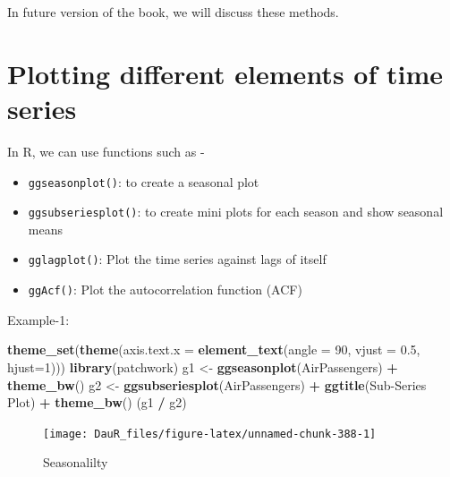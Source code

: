 \documentclass[
]{book}
\newenvironment{Shaded}{\begin{snugshade}}{\end{snugshade}}
\newcommand{\AttributeTok}[1]{\textcolor[rgb]{0.13,0.29,0.53}{#1}}
\newcommand{\DecValTok}[1]{\textcolor[rgb]{0.00,0.00,0.81}{#1}}
\newcommand{\FloatTok}[1]{\textcolor[rgb]{0.00,0.00,0.81}{#1}}
\newcommand{\FunctionTok}[1]{\textcolor[rgb]{0.13,0.29,0.53}{\textbf{#1}}}
\newcommand{\NormalTok}[1]{#1}
\newcommand{\OtherTok}[1]{\textcolor[rgb]{0.56,0.35,0.01}{#1}}
\newcommand{\SpecialCharTok}[1]{\textcolor[rgb]{0.81,0.36,0.00}{\textbf{#1}}}
\newcommand{\StringTok}[1]{\textcolor[rgb]{0.31,0.60,0.02}{#1}}
\providecommand{\tightlist}{%
  \setlength{\itemsep}{0pt}\setlength{\parskip}{0pt}}
\begin{document}
In future version of the book, we will discuss these methods.

\hypertarget{plotting-different-elements-of-time-series}{%
\section{Plotting different elements of time series}\label{plotting-different-elements-of-time-series}}

In R, we can use functions such as -

\begin{itemize}
\tightlist
\item
  \texttt{ggseasonplot()}: to create a seasonal plot
\item
  \texttt{ggsubseriesplot()}: to create mini plots for each season and show seasonal means
\item
  \texttt{gglagplot()}: Plot the time series against lags of itself
\item
  \texttt{ggAcf()}: Plot the autocorrelation function (ACF)
\end{itemize}

Example-1:

\begin{Shaded}
\begin{Highlighting}[]
\FunctionTok{theme\_set}\NormalTok{(}\FunctionTok{theme}\NormalTok{(}\AttributeTok{axis.text.x =} \FunctionTok{element\_text}\NormalTok{(}\AttributeTok{angle =} \DecValTok{90}\NormalTok{, }
                                           \AttributeTok{vjust =} \FloatTok{0.5}\NormalTok{, }
                                           \AttributeTok{hjust=}\DecValTok{1}\NormalTok{)))}
\FunctionTok{library}\NormalTok{(patchwork)}
\NormalTok{g1 }\OtherTok{\textless{}{-}} \FunctionTok{ggseasonplot}\NormalTok{(AirPassengers) }\SpecialCharTok{+}
  \FunctionTok{theme\_bw}\NormalTok{()}
\NormalTok{g2 }\OtherTok{\textless{}{-}} \FunctionTok{ggsubseriesplot}\NormalTok{(AirPassengers) }\SpecialCharTok{+}
  \FunctionTok{ggtitle}\NormalTok{(}\StringTok{\textquotesingle{}Sub{-}Series Plot\textquotesingle{}}\NormalTok{) }\SpecialCharTok{+}
  \FunctionTok{theme\_bw}\NormalTok{()}
\NormalTok{(g1 }\SpecialCharTok{/}\NormalTok{ g2)}
\end{Highlighting}
\end{Shaded}

\begin{figure}

{\centering \texttt{[image: DauR\_files/figure-latex/unnamed-chunk-388-1]} 

}

\caption{Seasonalilty}\label{fig:unnamed-chunk-388}
\end{figure}
\end{document}
